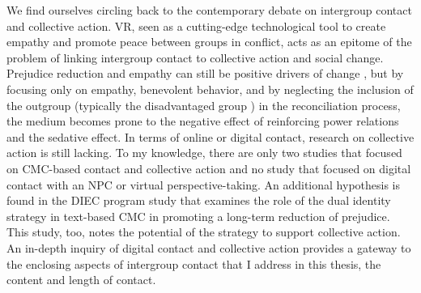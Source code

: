 \documentclass[dissertation,math,vertlayout,pdfa,colorlinks,nologo]{aaltoseries}
\begin{document}
We find ourselves circling back to the contemporary debate on intergroup contact and collective action. VR, seen as a cutting-edge technological tool to create empathy and promote peace between groups in conflict, acts as an epitome of the problem of linking intergroup contact to collective action and social change. Prejudice reduction and empathy can still be positive drivers of change \cite{abramsPrejudiceReductionCollective2012}, but by focusing only on empathy, benevolent behavior, and by neglecting the inclusion of the outgroup (typically the disadvantaged group \cite{messeriLandUnrealVirtual2024}) in the reconciliation process, the medium becomes prone to the negative effect of reinforcing power relations and the sedative effect. In terms of online or digital contact, research on collective action is still lacking. To my knowledge, there are only two studies that focused on CMC-based contact and collective action \cite{enicOnlineContactsSupported2024, schumannWhatCanBe2022} and no study that focused on digital contact with an NPC or virtual perspective-taking. An additional hypothesis is found in the DIEC program study \cite{whiteAchievingTwelvemonthsIntergroup2014} that examines the role of the dual identity strategy in text-based CMC in promoting a long-term reduction of prejudice. This study, too, notes the potential of the strategy to support collective action. An in-depth inquiry of digital contact and collective action provides a gateway to the enclosing aspects of intergroup contact that I address in this thesis, the content and length of contact.
\end{document}
